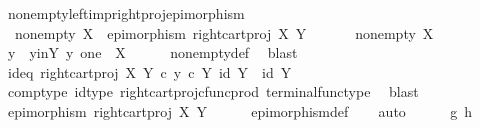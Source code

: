 \begin{isabellebody}
\ nonempty{\isacharunderscore}{\kern0pt}left{\isacharunderscore}{\kern0pt}imp{\isacharunderscore}{\kern0pt}right{\isacharunderscore}{\kern0pt}proj{\isacharunderscore}{\kern0pt}epimorphism{\isacharcolon}{\kern0pt}\isanewline
\ \ {\isachardoublequoteopen}nonempty\ X\ {\isasymLongrightarrow}\ epimorphism\ {\isacharparenleft}{\kern0pt}right{\isacharunderscore}{\kern0pt}cart{\isacharunderscore}{\kern0pt}proj\ X\ Y{\isacharparenright}{\kern0pt}{\isachardoublequoteclose}\isanewline
%
\isadelimproof
%
\endisadelimproof
%
\isatagproof
{}\isamarkupfalse%
\ {\isacharminus}{\kern0pt}\ \isanewline
\ \ \isamarkupfalse%
\ {\isachardoublequoteopen}nonempty\ X{\isachardoublequoteclose}\isanewline
\ \ \isamarkupfalse%
\ \isamarkupfalse%
\ y\ \ y{\isacharunderscore}{\kern0pt}in{\isacharunderscore}{\kern0pt}Y{\isacharcolon}{\kern0pt}\ {\isachardoublequoteopen}y{\isacharcolon}{\kern0pt}\ one\ {\isasymrightarrow}\ X{\isachardoublequoteclose}\isanewline
\ \ \ \ \isamarkupfalse%
\ nonempty{\isacharunderscore}{\kern0pt}def\ \isamarkupfalse%
\ blast\isanewline
\ \ \isamarkupfalse%
\ \isamarkupfalse%
\ id{\isacharunderscore}{\kern0pt}eq{\isacharcolon}{\kern0pt}\ {\isachardoublequoteopen}{\isacharparenleft}{\kern0pt}right{\isacharunderscore}{\kern0pt}cart{\isacharunderscore}{\kern0pt}proj\ X\ Y{\isacharparenright}{\kern0pt}\ {\isasymcirc}\isactrlsub c\ {\isasymlangle}y\ {\isasymcirc}\isactrlsub c\ {\isasymbeta}\isactrlbsub Y\isactrlesub {\isacharcomma}{\kern0pt}\ id\ Y{\isasymrangle}\ {\isacharequal}{\kern0pt}\ id\ Y{\isachardoublequoteclose}\isanewline
\ \ \ \ \ \isamarkupfalse%
\ comp{\isacharunderscore}{\kern0pt}type\ id{\isacharunderscore}{\kern0pt}type\ right{\isacharunderscore}{\kern0pt}cart{\isacharunderscore}{\kern0pt}proj{\isacharunderscore}{\kern0pt}cfunc{\isacharunderscore}{\kern0pt}prod\ terminal{\isacharunderscore}{\kern0pt}func{\isacharunderscore}{\kern0pt}type\ \isamarkupfalse%
\ blast\isanewline
\ \ \isamarkupfalse%
\ \isamarkupfalse%
\ {\isachardoublequoteopen}epimorphism\ {\isacharparenleft}{\kern0pt}right{\isacharunderscore}{\kern0pt}cart{\isacharunderscore}{\kern0pt}proj\ X\ Y{\isacharparenright}{\kern0pt}{\isachardoublequoteclose}\isanewline
\ \ \ \ \isamarkupfalse%
\ epimorphism{\isacharunderscore}{\kern0pt}def\isanewline
\ \ \isamarkupfalse%
\ auto\isanewline
\ \ \ \ \isamarkupfalse%
\ g\ h\isanewline

\end{isabellebody}
